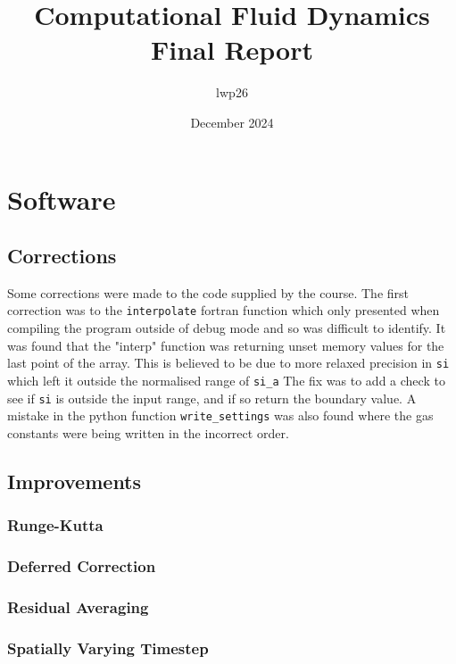 \documentclass{article}
\begin{document}
\title{Computational Fluid Dynamics \\
    \large Final Report}
\author{lwp26}
\date{December 2024}
\maketitle 

\section{Software}
\subsection{Corrections}

Some corrections were made to the code supplied by the course.
The first correction was to the \texttt{interpolate} fortran function which only presented when compiling the program outside of debug mode and so was difficult to identify.
It was found that the "interp" function was returning unset memory values for the last point of the array. This is believed to be due to more relaxed precision in \texttt{si} which left it outside the normalised range of \texttt{si\_a}
The fix was to add a check to see if \texttt{si} is outside the input range, and if so return the boundary value.
A mistake in the python function \texttt{write\_settings} was also found where the gas constants were being written in the incorrect order.
\subsection{Improvements}
\subsubsection{Runge-Kutta}

\subsubsection{Deferred Correction}

\subsubsection{Residual Averaging}

\subsubsection{Spatially Varying Timestep}
\end{document}
